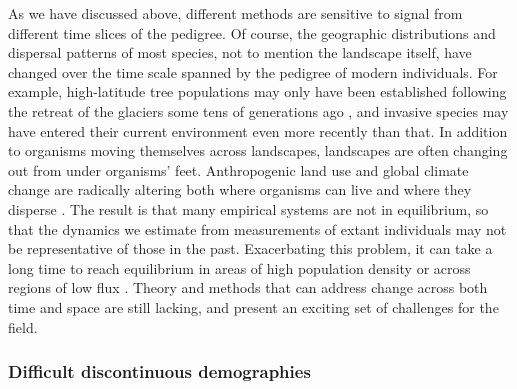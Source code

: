 \documentclass{ar-1col}
\begin{document}
As we have discussed above,
different methods are sensitive to signal
from different time slices of the pedigree.
Of course, the geographic distributions and dispersal patterns of most species,
not to mention the landscape itself,
have changed over the time scale spanned by the pedigree of modern individuals.
For example, 
high-latitude tree populations may only have been established
following the retreat of the glaciers
some tens of generations ago \citep{WhitlockMcCauley1999},
and invasive species may have entered their current
environment even more recently than that.
In addition to organisms moving themselves across landscapes,
landscapes are often changing out from under organisms' feet.
Anthropogenic land use
and global climate change
are radically altering both where organisms can live
and where they disperse \citep{parmesan1999}.
The result is that many empirical systems
are not in equilibrium,
so that the dynamics we estimate from
measurements of extant individuals may
not be representative of those in the past.
Exacerbating this problem,
it can take a long time to reach equilibrium
in areas of high population density
or across regions of low flux
\citep{CrowAoki1984group, whitlock1992temporal, slatkin1993isolation, WhitlockMcCauley1999}.
Theory and methods that can address change across both time and space
are still lacking,
and present an exciting set of challenges for the field.

\subsubsection{Difficult discontinuous demographies}
\end{document}
